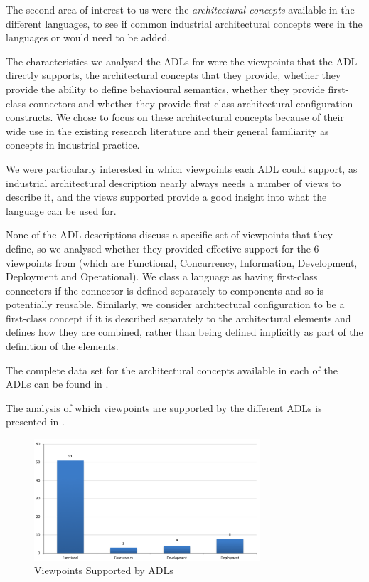 The second area of interest to us were the \emph{architectural concepts} available in the different languages, to see if common industrial architectural concepts were in the languages or would need to be added.

The characteristics we analysed the ADLs for were the viewpoints that the ADL directly supports, the architectural concepts that they provide, whether they provide the ability to define behavioural semantics, whether they provide first-class connectors and whether they provide first-class architectural configuration constructs.  We chose to focus on these architectural concepts because of their wide use in the existing research literature and their general familiarity as concepts in industrial practice.

We were particularly interested in which viewpoints each ADL could support, as industrial architectural description nearly always needs a number of views to describe it, and the views supported provide a good insight into what the language can be used for.

None of the ADL descriptions discuss a specific set of viewpoints that they define, so we analysed whether they provided effective support for the 6 viewpoints from \cite{rozanski2011-ssa2e} (which are Functional, Concurrency, Information, Development, Deployment and Operational).  We class a language as having first-class connectors if the connector is defined separately to components and so is potentially reusable.  Similarly, we consider architectural configuration to be a first-class concept if it is described separately to the architectural elements and defines how they are combined, rather than being defined implicitly as part of the definition of the elements.

The complete data set for the architectural concepts available in each of the ADLs can be found in .

The analysis of which viewpoints are supported by the different ADLs is presented in .

\begin{figure}
\centering
\includegraphics[width=0.75\textwidth]{Figures/litreview-adl-viewpoints}
\caption{Viewpoints Supported by ADLs}
\label{figure:litreview-adl-viewpoints}
\end{figure}

